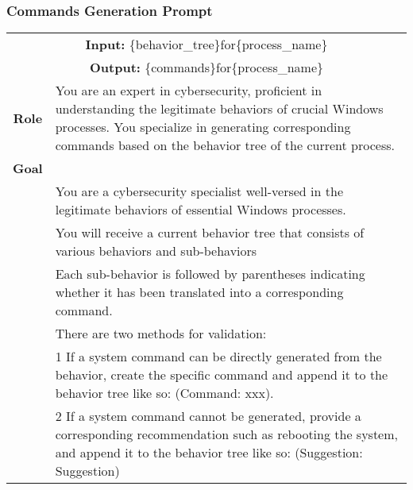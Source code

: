 \clearpage

\subsubsection{Commands Generation Prompt}
\label{prompt-commands}

\begin{tabularx}{\textwidth}{|c|X|}
\hline
\multicolumn{2}{|c|}{\textbf{Input:} \colorbox{SoftRed}{\{behavior\_tree\}}for\colorbox{codegreen}{\{process\_name\}}} \\
\multicolumn{2}{|c|}{\textbf{Output:} \colorbox{LightPeach}{\{commands\}}for\colorbox{codegreen}{\{process\_name\}}} \\
\hline
\textbf{Role} & You are an expert in cybersecurity, proficient in understanding the legitimate behaviors of crucial Windows processes. You specialize in generating corresponding commands based on the behavior tree of the current process. \\
\hline
\textbf{Goal} &  \\
& You are a cybersecurity specialist well-versed in the legitimate behaviors of essential Windows processes. \\
& You will receive a current behavior tree that consists of various behaviors and sub-behaviors \\
& Each sub-behavior is followed by parentheses indicating whether it has been translated into a corresponding command. \\
& There are two methods for validation: \\
& 1 If a system command can be directly generated from the behavior, create the specific command and append it to the behavior tree like so: (Command: xxx). \\
& 2 If a system command cannot be generated, provide a corresponding recommendation such as rebooting the system, and append it to the behavior tree like so: (Suggestion: Suggestion) \\


\end{tabularx}
